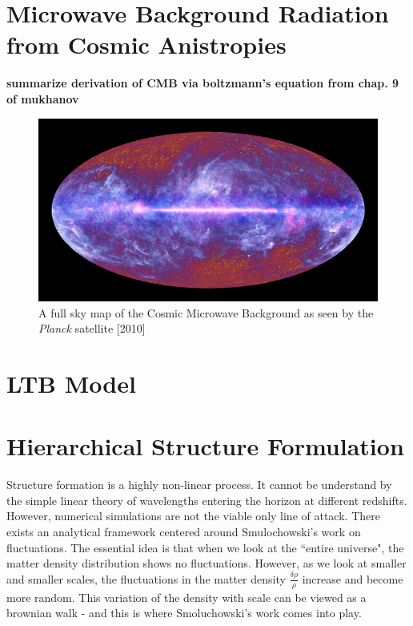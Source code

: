 \section{Microwave Background Radiation from Cosmic Anistropies}

\textbf{summarize derivation of CMB via boltzmann's equation from chap. 9 of mukhanov}

\begin{figure}[htbp]
\begin{center}
		\includegraphics[scale=0.3]{figures/voids/planck_fullsky}
		\caption{A full sky map of the Cosmic Microwave Background as seen by the \textit{Planck} satellite [2010]}
		\label{fig:planck_fullsky}
\end{center}
\end{figure}

\section{LTB Model}

\section{Hierarchical Structure Formulation}

Structure formation is a highly non-linear process. It cannot be understand by the simple linear theory of wavelengths entering the horizon at different redshifts. However, numerical simulations are not the viable only line of attack. There exists an analytical framework centered around Smulochowski's work on fluctuations. The essential idea is that when we look at the ``entire universe", the matter density distribution shows no fluctuations. However, as we look at smaller and smaller scales, the fluctuations in the matter density $ \frac{\delta \rho }{\rho} $ increase and become more random. This variation of the density with scale can be viewed as a brownian walk - and this is where Smoluchowski's work comes into play.

